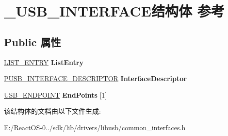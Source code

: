 \hypertarget{struct___u_s_b___i_n_t_e_r_f_a_c_e}{}\section{\+\_\+\+U\+S\+B\+\_\+\+I\+N\+T\+E\+R\+F\+A\+C\+E结构体 参考}
\label{struct___u_s_b___i_n_t_e_r_f_a_c_e}
\subsection*{Public 属性}
\begin{DoxyCompactItemize}
\item 
\mbox{\label{struct___u_s_b___i_n_t_e_r_f_a_c_e_aa90225295b63f310933e7e15c2660b59}} 
\hyperlink{struct___l_i_s_t___e_n_t_r_y}{L\+I\+S\+T\+\_\+\+E\+N\+T\+RY} {\bfseries List\+Entry}
\item 
\mbox{\label{struct___u_s_b___i_n_t_e_r_f_a_c_e_a4e3ce62f0ea69738fb9c6422fc574c22}} 
\hyperlink{struct___u_s_b___i_n_t_e_r_f_a_c_e___d_e_s_c_r_i_p_t_o_r}{P\+U\+S\+B\+\_\+\+I\+N\+T\+E\+R\+F\+A\+C\+E\+\_\+\+D\+E\+S\+C\+R\+I\+P\+T\+OR} {\bfseries Interface\+Descriptor}
\item 
\mbox{\label{struct___u_s_b___i_n_t_e_r_f_a_c_e_ada10c47427feaab87a9778d8bb0c1450}} 
\hyperlink{struct___u_s_b___e_n_d_p_o_i_n_t}{U\+S\+B\+\_\+\+E\+N\+D\+P\+O\+I\+NT} {\bfseries End\+Points} \mbox{[}1\mbox{]}
\end{DoxyCompactItemize}


该结构体的文档由以下文件生成\+:\begin{DoxyCompactItemize}
\item 
E\+:/\+React\+O\+S-\/0../sdk/lib/drivers/libusb/common\+\_\+interfaces.\+h\end{DoxyCompactItemize}
